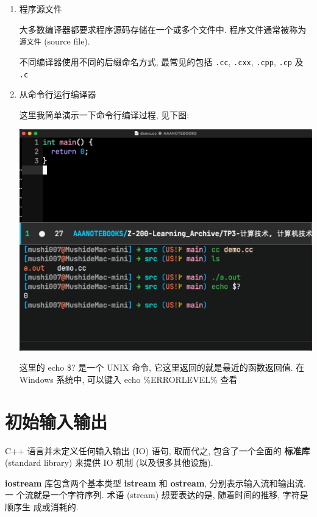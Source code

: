 \documentclass[lang=cn]{elegantbook}
\begin{document}
\begin{enumerate}
\item 程序源文件
\label{sec:org41a80d5}

大多数编译器都要求程序源码存储在一个或多个文件中. 程序文件通常被称为 \texttt{源文件}
(source file).

不同编译器使用不同的后缀命名方式, 最常见的包括 \texttt{.cc}, \texttt{.cxx}, \texttt{.cpp}, \texttt{.cp} 及 \texttt{.c}

\item 从命令行运行编译器
\label{sec:org15e4064}

这里我简单演示一下命令行编译过程, 见下图:

\begin{center}
\includegraphics[width=1.0\textwidth]{img/democc_演示.png}
\end{center}

\begin{note}
这里的 echo \$? 是一个 UNIX 命令, 它这里返回的就是最近的函数返回值. 在 Windows 系统中, 可以键入 echo \%ERRORLEVEL\% 查看
\end{note}
\end{enumerate}

\section{初始输入输出}
\label{sec:org9122157}

C++ 语言并未定义任何输入输出 (IO) 语句, 取而代之, 包含了一个全面的 \textbf{标准库}
(standard library) 来提供 IO 机制 (以及很多其他设施).

\textbf{iostream} 库包含两个基本类型 \textbf{istream} 和 \textbf{ostream}, 分别表示输入流和输出流. 一
个流就是一个字符序列. 术语 (stream) 想要表达的是, 随着时间的推移, 字符是顺序生
成或消耗的.
\end{document}
